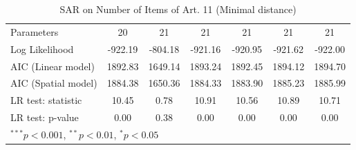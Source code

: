 \begin{table}[!h]
\begin{center}
\begin{tabular}{l c c c c c c }
Parameters              & 20           & 21           & 21           & 21           & 21           & 21           \\
Log Likelihood          & -922.19      & -804.18      & -921.16      & -920.95      & -921.62      & -922.00      \\
AIC (Linear model)      & 1892.83      & 1649.14      & 1893.24      & 1892.45      & 1894.12      & 1894.70      \\
AIC (Spatial model)     & 1884.38      & 1650.36      & 1884.33      & 1883.90      & 1885.23      & 1885.99      \\
LR test: statistic      & 10.45        & 0.78         & 10.91        & 10.56        & 10.89        & 10.71        \\
LR test: p-value        & 0.00         & 0.38         & 0.00         & 0.00         & 0.00         & 0.00         \\
\bottomrule
\multicolumn{7}{l}{\scriptsize{$^{***}p<0.001$, $^{**}p<0.01$, $^*p<0.05$}}
\end{tabular}
\caption{SAR on Number of Items of Art. 11 (Minimal distance)}
\label{table:coefficients}
\end{center}
\end{table}
